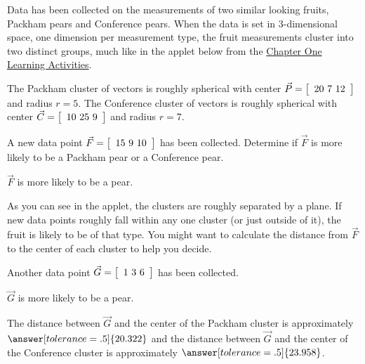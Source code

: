 \documentclass{ximera}
\author{Zack Reed}
\begin{document}
\begin{exercise}

  Data has been collected on the measurements of two similar looking fruits, Packham pears and Conference pears. When the data is set in 3-dimensional space, one dimension per measurement type, the fruit measurements cluster into two distinct groups, much like in the applet below from the \href{https://ximera.osu.edu/appliedlinearalgebra/c1ChapterOne/learningActivities/m1LearningActivities/m1s1Vectors/vectorsAreEverywhereOne}{Chapter One Learning Activities}.

  \begin{center}
  \end{center}

  The Packham cluster of vectors is roughly spherical with center $\vec{P} = \startmat{c} 20 \ 7 \ 12 \stopmat$ and radius $r = 5$. The Conference cluster of vectors is roughly spherical with center $\vec{C} = \startmat{c} 10 \ 25 \ 9 \stopmat$ and radius $r = 7$.

  A new data point $\vec{F} = \startmat{c} 15 \ 9 \ 10 \stopmat$ has been collected. Determine if $\vec{F}$ is more likely to be a Packham pear or a Conference pear.
  
  $\vec{F}$ is more likely to be a 
     pear. 
  
  \begin{hint}
  
  As you can see in the applet, the clusters are roughly separated by a plane. If new data points roughly fall within any one cluster (or just outside of it), the fruit is likely to be of that type. You might want to calculate the distance from $\vec{F}$ to the center of each cluster to help you decide.
  
  \end{hint}
  
  Another data point $\vec{G} = \startmat{c} 1 \ 3 \ 6 \stopmat$ has been collected.
  
  $\vec{G}$ is more likely to be a 
    pear.
  
  The distance between $\vec{G}$ and the center of the Packham cluster is approximately $\answer[tolerance=.5]{20.322}$ and the distance between $\vec{G}$ and the center of the Conference cluster is approximately $\answer[tolerance=.5]{23.958}$.

\end{exercise}
\end{document}
